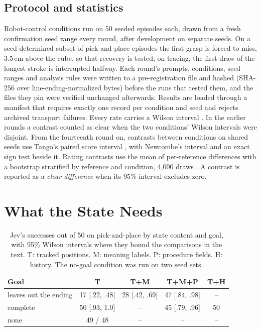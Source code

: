 \documentclass[11pt]{article}
\begin{document}
\subsection{Protocol and statistics}

Robot-control conditions run on 50 seeded episodes each, drawn from a fresh confirmation seed range every round, after development on separate seeds. On a seed-determined subset of pick-and-place episodes the first grasp is forced to miss, 3.5\,cm above the cube, so that recovery is tested; on tracing, the first draw of the longest stroke is interrupted halfway. Each round's prompts, conditions, seed ranges and analysis rules were written to a pre-registration file and hashed (SHA-256 over line-ending-normalized bytes) before the runs that tested them, and the files they pin were verified unchanged afterwards. Results are loaded through a manifest that requires exactly one record per condition and seed and rejects archived transport failures. Every rate carries a Wilson interval \citep{wilson}. In the earlier rounds a contrast counted as clear when the two conditions' Wilson intervals were disjoint. From the fourteenth round on, contrasts between conditions on shared seeds use Tango's paired score interval \citep{tango}, with Newcombe's interval \citep{newcombe} and an exact sign test beside it. Rating contrasts use the mean of per-reference differences with a bootstrap stratified by reference and condition, 4,000 draws \citep{efron}. A contrast is reported as a \emph{clear difference} when its 95\% interval excludes zero.
\section{What the State Needs}
\label{sec:fields}

\begin{table}[tbp]
\centering
\caption{Jev's successes out of 50 on pick-and-place by state content and goal, with 95\% Wilson intervals where they bound the comparisons in the text. T: tracked positions. M: meaning labels. P: procedure fields. H: history. The no-goal condition was run on two seed sets.}
\label{tab:fields}
\begin{tabular}{lcccc}
\toprule
Goal & T & T+M & T+M+P & T+H \\
\midrule
leaves out the ending & 17 [.22, .48] & 28 [.42, .69] & 47 [.84, .98] & -- \\
complete & 50 [.93, 1.0] & -- & 45 [.79, .96] & 50 \\
none & 49 / 48 & -- & -- & -- \\
\bottomrule
\end{tabular}
\end{table}
\end{document}
